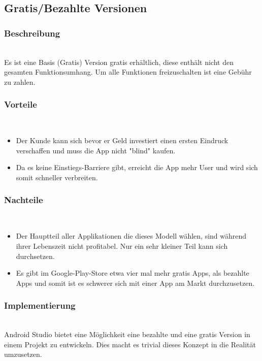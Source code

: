 \documentclass[FIPLY_base.tex]{subfiles}
\begin{document}
\subsection{Gratis/Bezahlte Versionen}


\subsubsection{Beschreibung}\ \\
Es ist eine Basis (Gratis) Version gratis erhältlich, diese enthält nicht den gesamten Funktionsumhang.
Um alle Funktionen freizuschalten ist eine Gebühr zu zahlen.

\subsubsection{Vorteile}\ \\
\begin{itemize}
\item Der Kunde kann sich bevor er Geld investiert einen ersten Eindruck verschaffen und muss die App nicht "blind" kaufen.
\item Da es keine Einstiegs-Barriere gibt, erreicht die App mehr User und wird sich somit schneller verbreiten.
\end{itemize}

\subsubsection{Nachteile}\ \\
\begin{itemize}
\item Der Hauptteil aller Applikationen die dieses Modell wählen, sind während ihrer Lebenszeit nicht profitabel. Nur ein sehr kleiner Teil kann sich durchsetzen.
\item Es gibt im Google-Play-Store etwa vier mal mehr gratis Apps, als bezahlte Apps und somit ist es schwerer sich mit einer App am Markt durchzusetzen.
\end{itemize}

\subsubsection{Implementierung}\ \\

Android Studio bietet eine Möglichkeit eine bezahlte und eine gratis Version in einem Projekt zu entwickeln.
Dies macht es trivial dieses Konzept in die Realität umzusetzen.
\end{document}
